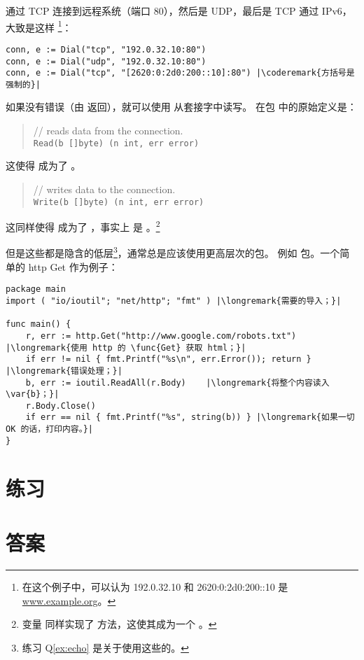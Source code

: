 通过 TCP 连接到远程系统（端口 80），然后是 UDP，最后是 TCP 通过 IPv6，大致是这样
\footnote{在这个例子中，可以认为 192.0.32.10 和 2620:0:2d0:200::10 是 \url{www.example.org}。}：
\begin{lstlisting}
conn, e := Dial("tcp", "192.0.32.10:80")
conn, e := Dial("udp", "192.0.32.10:80")
conn, e := Dial("tcp", "[2620:0:2d0:200::10]:80") |\coderemark{方括号是强制的}|
\end{lstlisting}

如果没有错误（由  返回），就可以使用  从套接字中读写。
在包  中的原始定义是：
\begin{quote}
//  reads data from the connection.\\
\lstinline{Read(b []byte) (n int, err error)}
\end{quote}
这使得  成为了 。

\begin{quote}
//  writes data to the connection.\\
\lstinline{Write(b []byte) (n int, err error)}
\end{quote}
这同样使得  成为了 ，事实上  是 。\footnote{变量  同样实现了  方法，这使其成为一个 。}

但是这些都是隐含的低层\footnote{练习 Q\ref{ex:echo} 是关于使用这些的。}，通常总是应该使用更高层次的包。
例如  包。一个简单的 http Get 作为例子：
\begin{lstlisting}
package main
import ( "io/ioutil"; "net/http"; "fmt" ) |\longremark{需要的导入；}|

func main() {
    r, err := http.Get("http://www.google.com/robots.txt") |\longremark{使用 http 的 \func{Get} 获取 html；}|
    if err != nil { fmt.Printf("%s\n", err.Error()); return } |\longremark{错误处理；}|
    b, err := ioutil.ReadAll(r.Body)    |\longremark{将整个内容读入 \var{b}；}|
    r.Body.Close()  
    if err == nil { fmt.Printf("%s", string(b)) } |\longremark{如果一切 OK 的话，打印内容。}|
}
\end{lstlisting}
\showremarks

\section{练习}














\cleardoublepage
\section{答案}
\shipoutAnswer
